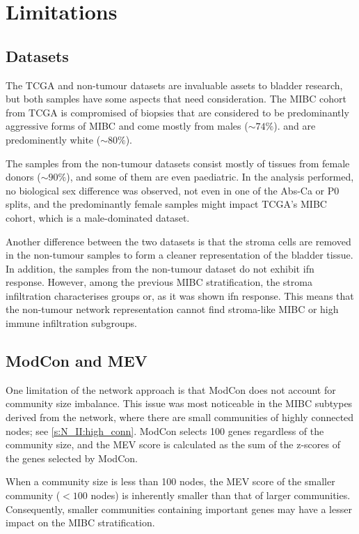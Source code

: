\section{Limitations} \label{s:limitations}

\subsection*{Datasets}

The TCGA and non-tumour datasets are invaluable assets to bladder research, but both samples have some aspects that need consideration. The MIBC cohort from TCGA is compromised of biopsies that are considered to be predominantly aggressive forms of MIBC and come mostly from males (\(\sim74\%\)). and are predominently white (\(\sim80\%\)).

The samples from the non-tumour datasets consist mostly of tissues from female donors (\(\sim90\%\)), and some of them are even paediatric. In the analysis performed, no biological sex difference was observed, not even in one of the Abs-Ca or P0 splits, and the predominantly female samples might impact TCGA's MIBC cohort, which is a male-dominated dataset.

Another difference between the two datasets is that the stroma cells are removed in the non-tumour samples to form a cleaner representation of the bladder tissue. In addition, the samples from the non-tumour dataset do not exhibit \acrfull{ifn} response. However, among the previous MIBC stratification, the stroma infiltration characterises groups or, as it was shown \acrshort{ifn} response. This means that the non-tumour network representation cannot find stroma-like MIBC or high immune infiltration subgroups.


\subsection*{ModCon and MEV}

One limitation of the network approach is that ModCon does not account for community size imbalance. This issue was most noticeable in the MIBC subtypes derived from the network, where there are small communities of highly connected nodes; see \cref{s:N_II:high_conn}. ModCon selects 100 genes regardless of the community size, and the MEV score is calculated as the sum of the z-scores of the genes selected by ModCon.

When a community size is less than 100 nodes, the MEV score of the smaller community (\(<100\) nodes) is inherently smaller than that of larger communities. Consequently, smaller communities containing important genes may have a lesser impact on the MIBC stratification.


